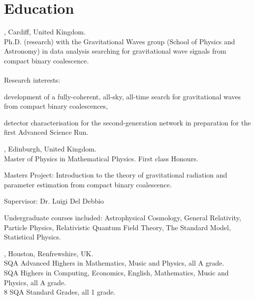 \section{Education}
, Cardiff, United Kingdom.\\
Ph.D. (research) with the Gravitational Waves group (School of Physics and Astronomy) in data analysis searching for gravitational wave signals from compact binary coalescence.\\\\
Research interests:
\begin{closeitem}
\item development of a fully-coherent, all-sky, all-time search for gravitational waves from compact binary coalescences,
\item detector characterisation for the second-generation network in preparation for the first Advanced Science Run.
\end{closeitem}

, Edinburgh, United Kingdom.\\
Master of Physics in Mathematical Physics. First class Honours.
\begin{closeitem}
\item Masters Project: Introduction to the theory of gravitational radiation and parameter estimation from compact binary coalescence.
\item Supervisor: Dr. Luigi Del Debbio
\end{closeitem}
Undergraduate courses included: Astrophysical Cosmology, General Relativity, Particle Physics, Relativistic Quantum Field Theory, The Standard Model, Statistical Physics.

, Houston, Renfrewshire, UK.\\
SQA Advanced Highers in Mathematics, Music and Physics, all A grade.\\
SQA Highers in Computing, Economics, English, Mathematics, Music and Physics, all A grade.\\
8 SQA Standard Grades, all 1 grade. 
